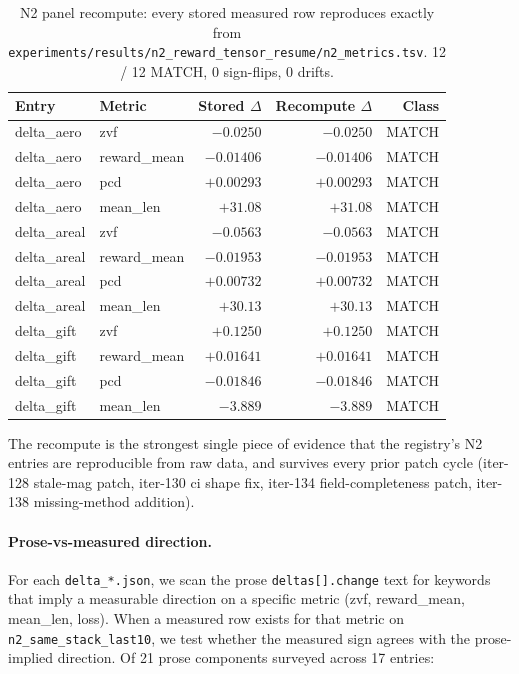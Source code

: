 \documentclass{article}
\begin{document}
\begin{table}[h]
\centering
\small
\begin{tabular}{llrrr}
\toprule
Entry & Metric & Stored $\Delta$ & Recompute $\Delta$ & Class \\
\midrule
delta\_aero  & zvf         & $-0.0250$  & $-0.0250$  & MATCH \\
delta\_aero  & reward\_mean & $-0.01406$ & $-0.01406$ & MATCH \\
delta\_aero  & pcd         & $+0.00293$  & $+0.00293$  & MATCH \\
delta\_aero  & mean\_len    & $+31.08$   & $+31.08$   & MATCH \\
delta\_areal & zvf         & $-0.0563$  & $-0.0563$  & MATCH \\
delta\_areal & reward\_mean & $-0.01953$ & $-0.01953$ & MATCH \\
delta\_areal & pcd         & $+0.00732$  & $+0.00732$  & MATCH \\
delta\_areal & mean\_len    & $+30.13$   & $+30.13$   & MATCH \\
delta\_gift  & zvf         & $+0.1250$  & $+0.1250$  & MATCH \\
delta\_gift  & reward\_mean & $+0.01641$ & $+0.01641$ & MATCH \\
delta\_gift  & pcd         & $-0.01846$ & $-0.01846$ & MATCH \\
delta\_gift  & mean\_len    & $-3.889$   & $-3.889$   & MATCH \\
\bottomrule
\end{tabular}
\caption{N2 panel recompute: every stored measured row reproduces
exactly from \texttt{experiments/results/n2\_reward\_tensor\_resume/n2\_metrics.tsv}.
12 / 12 MATCH, 0 sign-flips, 0 drifts.}
\label{tab:p6-iter150-recompute}
\end{table}

The recompute is the strongest single piece of evidence that the
registry's N2 entries are reproducible from raw data, and survives every
prior patch cycle (iter-128 stale-mag patch, iter-130 ci shape fix,
iter-134 field-completeness patch, iter-138 missing-method addition).

\paragraph{Prose-vs-measured direction.}
For each \texttt{delta\_*.json}, we scan the prose
\texttt{deltas[].change} text for keywords that imply a measurable
direction on a specific metric (zvf, reward\_mean, mean\_len, loss).
When a measured row exists for that metric on
\texttt{n2\_same\_stack\_last10}, we test whether the measured sign
agrees with the prose-implied direction. Of 21 prose components
surveyed across 17 entries:
\end{document}
